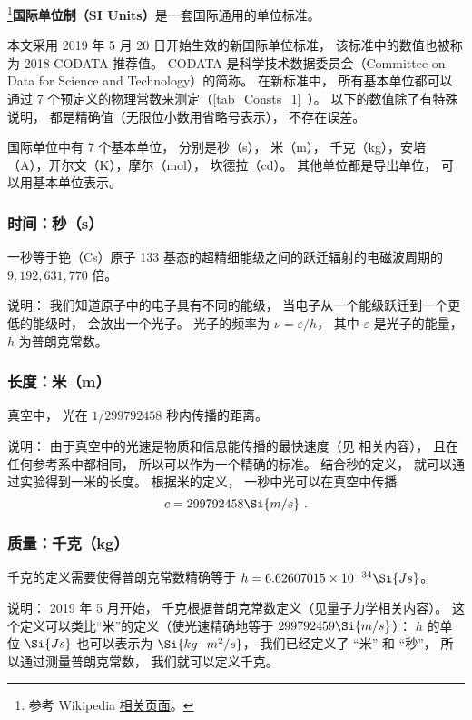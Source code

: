 

\footnote{参考 Wikipedia \href{https://en.wikipedia.org/wiki/International_System_of_Units}{相关页面}。}\textbf{国际单位制（SI Units）}是一套国际通用的单位标准。

本文采用 2019 年 5 月 20 日开始生效的新国际单位标准， 该标准中的数值也被称为 2018 CODATA 推荐值。 CODATA 是科学技术数据委员会（Committee on Data for Science and Technology）的简称。 在新标准中， 所有基本单位都可以通过 7 个预定义的物理常数来测定（\autoref{tab_Consts_1}~）。 以下的数值除了有特殊说明， 都是精确值（无限位小数用省略号表示）， 不存在误差。

国际单位中有 7 个基本单位， 分别是秒（s）， 米（m）， 千克（kg），安培（A），开尔文（K），摩尔（mol）， 坎德拉（cd）。 其他单位都是导出单位， 可以用基本单位表示。

\subsubsection{时间：秒（s）}
一秒等于铯（Cs）原子 133 基态的超精细能级之间的跃迁辐射的电磁波周期的 $9,192,631,770$ 倍。 

说明： 我们知道原子中的电子具有不同的能级， 当电子从一个能级跃迁到一个更低的能级时， 会放出一个光子。 光子的频率为 $\nu  = \varepsilon /h$，   其中 $\varepsilon $ 是光子的能量， $h$ 为普朗克常数。

\subsubsection{长度：米（m）}
真空中， 光在 $1/299792458$ 秒内传播的距离。

说明： 由于真空中的光速是物质和信息能传播的最快速度（见 相关内容）， 且在任何参考系中都相同， 所以可以作为一个精确的标准。 结合秒的定义， 就可以通过实验得到一米的长度。 根据米的定义， 一秒中光可以在真空中传播
\begin{equation}
c = 299792458 \Si{m/s}~.
\end{equation}

\subsubsection{质量：千克（kg）}
千克的定义需要使得普朗克常数精确等于 $h = 6.62607015\times10^{-34}\Si{Js}$。

说明： 2019 年 5 月开始， 千克根据普朗克常数定义（见量子力学相关内容）。 这个定义可以类比“米”的定义（使光速精确地等于 $299792459\Si{m/s}$）： $h$ 的单位 $\Si{Js}$ 也可以表示为 $\Si{kg\cdot m^2/s}$， 我们已经定义了 “米” 和 “秒”， 所以通过测量普朗克常数， 我们就可以定义千克。

